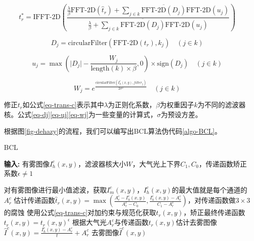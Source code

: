 \begin{equation}
    t_r^* = \text{IFFT-2D}\left(\frac{\frac{\lambda}{\beta}\text{FFT-2D}(\hat t_r) + \sum\limits_{j\in k}\overline{\text{FFT-2D}(D_j)}\text{FFT-2D}(u_j)}{\frac{\lambda}{\beta} + \sum\limits_{j\in k}\overline{\text{FFT-2D}(D_j)}\text{FFT-2D}(u_j)}\right)
    \label{eq-trans-c}
\end{equation}

\begin{equation}
    D_j = \text{circularFilter}(\text{FFT-2D}(t_r), k_j)\quad(j\in k)
    \label{eq-dj}
\end{equation}

\begin{equation}
    u_j = \max{(\lvert D_j\rvert - \frac{W_j}{\text{length}(k)\times\beta} ,0)}\times \text{sign}(D_j)\quad(j\in k)
    \label{eq-uj}
\end{equation}

\begin{equation}
    W_j = e^{\frac{\text{circularFilter}(I_h^c(x,y), filter_j)}{2\sigma^2}}\quad(j\in k)
    \label{eq-wj}
\end{equation}

修正$t_r$如公式\eqref{eq-trans-c}表示其中$\lambda$为正则化系数，$\beta$为权重因子$k$为不同的滤波器核。公式\eqref{eq-dj}\eqref{eq-uj}\eqref{eq-wj}为一些变量的计算式，$\sigma$为预设方差。

根据图\ref{fig-dehazy}的流程，我们可以编写出BCL算法伪代码\ref{algo-BCL}。

\begin{algorithm}[t]
    \caption{BCL}
    \label{algo-BCL}
    \textbf{输入:} 有雾图像$I_h^c(x,y)$，滤波器核大小$W$，大气光上下界$C_1,C_0$，传递函数矫正系数$\epsilon\neq1$
    \begin{algorithmic}
    \State 对有雾图像进行最小值滤波，获取$I_m^c(x,y)$，$I_h^c(x,y)$的最大值就是每个通道的$A_r^c$
    \State 估计传递函数$\hat t_r(x,y) = \max{(\frac{A_r^c - I_h^c(x,y)}{A_r^c - C_0},\frac{I_h^c(x,y)-A_r^c}{C_1 - A_r^c})}$，对传递函数做$3\times 3$的腐蚀
    \State 使用公式\eqref{eq-trans-c}对加约束与规范化获取$t_r(x,y)$，矫正最终传递函数$t_r(x,y) = t_r(x,y)^\epsilon$
    \State 根据大气光$A_r^c$与传递函数$t_r(x,y)$估计去雾图像$\hat I^c(x,y) = \frac{I_h^c(x,y) - A_r^c}{t} + A_r^c$
    \State \Return 去雾图像$\hat I^c(x,y)$
    \end{algorithmic}
\end{algorithm}

